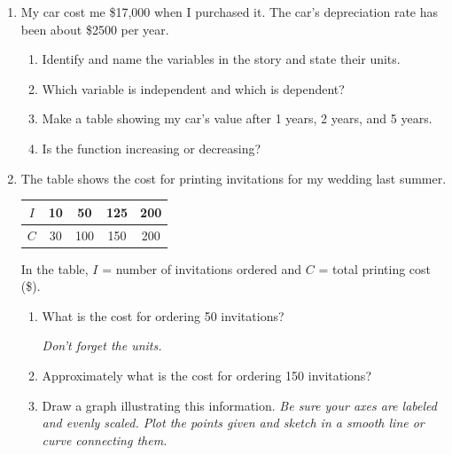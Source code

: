 \documentclass[12pt]{article}
\begin{document}
\begin{enumerate}


\item My car cost me \$17,000 when I purchased it.  The car's depreciation rate has been about \$2500 per year.

\begin{enumerate}
\item Identify and name the variables in the story and state their units.
\vfill
\item Which variable is independent and which is dependent?
\vfill
\item Make a table showing my car's value after 1 years, 2 years, and 5 years.
\vfill
\vfill
\vfill
\item Is the function increasing or decreasing?
\vfill
\end{enumerate}

\newpage

\item The table shows the cost for printing invitations for my wedding last summer.  

\begin{center}
\begin{tabular} {|c|c|c|c|c|} \hline
$I$ & 10 & 50 & 125 & 200 \\ \hline
$C$ & 30 & 100 & 150 & 200 \\ \hline
\end{tabular}
\end{center}

In the table, $I$ = number of invitations ordered and $C$ = total printing cost  (\$).

\begin{enumerate}
\item What is the cost for ordering 50 invitations?

\emph{Don't forget the units.}
\vfill
\item Approximately what is the cost for ordering 150 invitations?
\vfill
\item Draw a graph illustrating this information.  \emph{Be sure your axes are labeled and evenly scaled.  Plot the points given and sketch in a smooth line or curve connecting them.}


\end{enumerate}
\end{enumerate}
\end{document}
